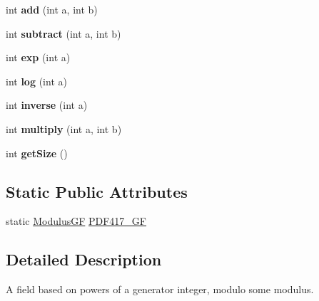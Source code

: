 \begin{DoxyCompactItemize}
int {\bfseries add} (int a, int b)
\item 
\mbox{\label{classzxing_1_1pdf417_1_1decoder_1_1ec_1_1_modulus_g_f_ae6655e555e64218303f5f45a41d1ed0e}} 
int {\bfseries subtract} (int a, int b)
\item 
\mbox{\label{classzxing_1_1pdf417_1_1decoder_1_1ec_1_1_modulus_g_f_ad9750943fe5c82b105e261759070be45}} 
int {\bfseries exp} (int a)
\item 
\mbox{\label{classzxing_1_1pdf417_1_1decoder_1_1ec_1_1_modulus_g_f_aeecc86d49753bf288017a64417df9893}} 
int {\bfseries log} (int a)
\item 
\mbox{\label{classzxing_1_1pdf417_1_1decoder_1_1ec_1_1_modulus_g_f_aa132ecaf846df2345ea9c55295a139f4}} 
int {\bfseries inverse} (int a)
\item 
\mbox{\label{classzxing_1_1pdf417_1_1decoder_1_1ec_1_1_modulus_g_f_ab788a1652ce5fdd8da36b7a82f984326}} 
int {\bfseries multiply} (int a, int b)
\item 
\mbox{\label{classzxing_1_1pdf417_1_1decoder_1_1ec_1_1_modulus_g_f_ab1cf1ff514318fd866887036ac334f91}} 
int {\bfseries get\+Size} ()
\end{DoxyCompactItemize}
\subsection*{Static Public Attributes}
\begin{DoxyCompactItemize}
\item 
static \mbox{\hyperlink{classzxing_1_1pdf417_1_1decoder_1_1ec_1_1_modulus_g_f}{Modulus\+GF}} \mbox{\hyperlink{classzxing_1_1pdf417_1_1decoder_1_1ec_1_1_modulus_g_f_a571ec964dd17f9d98cd347e9cb4e8e5d}{P\+D\+F417\+\_\+\+GF}}
\end{DoxyCompactItemize}


\subsection{Detailed Description}
A field based on powers of a generator integer, modulo some modulus.

